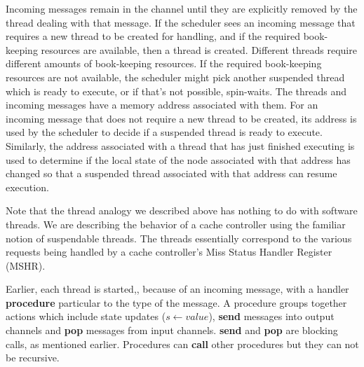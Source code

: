 Incoming messages remain in the channel until they are explicitly removed by
the thread dealing with that message. If the scheduler sees an incoming message
that requires a new thread to be created for handling, and if the required
book-keeping resources are available, then a thread is created.
Different threads require different amounts of book-keeping resources. If the
required book-keeping resources are not available, the scheduler might pick
another suspended thread which is ready to execute, or if that's not possible,
spin-waits.  The threads and incoming messages have a memory address associated
with them. For an incoming message that does not require a new thread to be
created, its address is used by the scheduler to decide if a suspended thread
is ready to execute. Similarly, the address associated with a thread that has
just finished executing is used to determine if the local state of the node
associated with that address has changed so that a suspended thread associated
with that address can resume execution.  

Note that the thread analogy we described above has nothing to do with software
threads. We are describing the behavior of a cache controller using the familiar
notion of suspendable threads. The threads essentially correspond to the various
requests being handled by a cache controller's Miss Status Handler Register
(MSHR).

Earlier, each thread is started,, because of an incoming message, with a
handler \textbf{procedure} particular to the type of the message. A procedure
groups together actions which include state updates ($s \gets value$),
\textbf{send} messages into output channels and \textbf{pop} messages from
input channels. \textbf{send} and \textbf{pop} are blocking calls, as mentioned
earlier. Procedures can \textbf{call} other procedures but they can not be
recursive.
